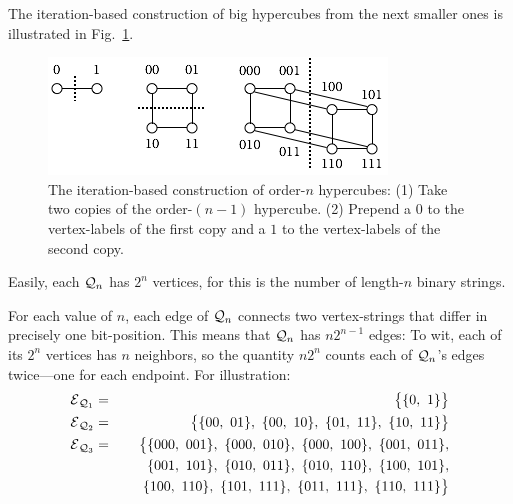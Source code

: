 \begin{itemize}
\smallskip

The iteration-based construction of big hypercubes from the next smaller ones is illustrated in Fig.~\ref{fig:hypercube}.
\begin{figure}[hbt]
\begin{center}
       \includegraphics[scale=0.6]{FiguresGraph/hypercube}
\caption{The iteration-based construction of order-$n$ hypercubes:  (1) Take two copies of the order-$(n-1)$ hypercube.  (2) Prepend a $0$ to the vertex-labels of the first copy and a $1$ to the vertex-labels of the second copy.}
  \label{fig:hypercube}
\end{center}
\end{figure}

\smallskip

Easily, each $\mbox{$\cal Q$}_n$ has $2^n$ vertices, for this is the number of length-$n$ binary strings.

\medskip

For each value of $n$, each edge of $\mbox{$\cal Q$}_n$ connects two vertex-strings that differ in precisely one bit-position.  This means that $\mbox{$\cal Q$}_n$ has $n 2^{n-1}$ edges: To wit, each of its $2^n$ vertices has $n$ neighbors, so the quantity $n 2^n$ counts each of $\mbox{$\cal Q$}_n$'s edges twice---one for each endpoint.  For illustration:
\begin{eqnarray*}
\mbox{$\cal E$}_{{\mbox{{\scriptsize $\cal Q$}}}_1}
  & = &
\big\{ \{ 0, \ 1 \} \big\} \\
\mbox{$\cal E$}_{{\mbox{{\scriptsize $\cal Q$}}}_2}
  & = & \big\{
\{ 00, \ 01 \}, \ \{ 00, \ 10\}, \
\{ 01, \ 11 \}, \ \{ 10, \ 11\} 
\big\} \\
\mbox{$\cal E$}_{{\mbox{{\scriptsize $\cal Q$}}}_3}
  & = & \big\{ 
\{000, \ 001\}, \
\{000, \ 010\}, \
\{000, \ 100\}, \
\{001, \ 011\}, \\
  &  & \hspace*{.2in}
\{001, \ 101\}, \
\{010, \ 011\}, \
\{010, \ 110\}, \
\{100, \ 101\}, \\
  &  & \hspace*{.2in}
\{100, \ 110\}, \
\{101, \ 111\}, \
\{011, \ 111\}, \
\{110, \ 111\}
\big\}
\end{eqnarray*}
\end{itemize}

\medskip

